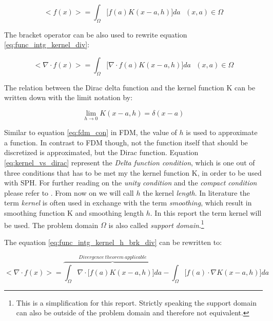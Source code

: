 \begin{equation} \label{eq:func_intg_kernel_h_brk}
< f(x) > = \int_{\Omega} \biggl [ f(a) K(x-a, h) \biggr ] d a \ \ \ (x, a) \in \Omega
\end{equation}

The bracket operator can be also used to rewrite equation \ref{eq:func_intg_kernel_div}:

\begin{equation} \label{eq:func_intg_kernel_h_brk_div}
< \nabla \cdot f(x) > = \int_{\Omega} \biggl [ \nabla \cdot f(a) K(x-a, h) \biggr ] d a \ \ \ (x, a) \in \Omega
\end{equation}

The relation between the Dirac delta function and the kernel function K can be written down with the limit notation by:

\begin{equation} \label{eq:kernel_vs_dirac}
\lim_{h \to 0} K(x-a, h) = \delta(x-a)
\end{equation}

Similar to equation \ref{eq:fdm_con} in FDM, the value of $ h $ is used to approximate a function. In contrast to FDM though, not the function itself that should be discretized is approximated, but the Dirac function. Equation \ref{eq:kernel_vs_dirac} represent the \emph{Delta function condition}, which is one out of three conditions that has to be met my the kernel function K, in order to be used with SPH. For further reading on the \emph{unity condition} and the \emph{compact condition} please refer to \citep[pg. 37]{Liu2003}. From now on we will call $ h $ the kernel \emph{length}. In literature the term \emph{kernel} is often used in exchange with the term \emph{smoothing}, which result in smoothing function K and smoothing length $h$. In this report the term kernel will be used. The problem domain $ \Omega $ is also called \emph{support domain}.\footnote{This is a simplification for this report. Strictly speaking the support domain can also be outside of the problem domain and therefore not equivalent.}  

The equation \ref{eq:func_intg_kernel_h_brk_div} can be rewritten to: 

\begin{equation} \label{eq:func_intg_kernel_h_brk_div}
< \nabla \cdot f(x) > = 
\overbrace{\int_{\Omega} \nabla \cdot \biggl [ f(a) K(x-a, h) \biggr ] d a}^{Divergence\ theorem\ applicable} -
\int_{\Omega} \biggl [ f(a) \cdot \nabla K(x-a, h) \biggr ] d a
\end{equation}

